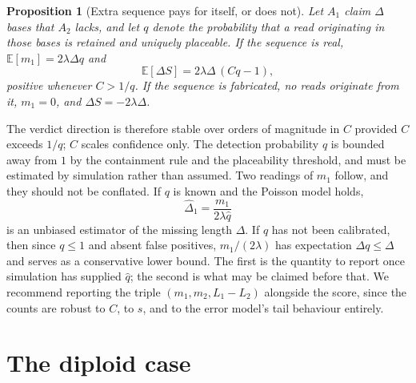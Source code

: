 \documentclass[11pt]{article}
\newtheorem{proposition}{Proposition}
\begin{document}
\begin{proposition}[Extra sequence pays for itself, or does not]
\label{prop:count}
Let $A_1$ claim $\Delta$ bases that $A_2$ lacks, and let $q$ denote the
probability that a read originating in those bases is retained and uniquely
placeable.  If the sequence is real, $\mathbb{E}[m_1] = 2\lambda\Delta q$ and
\begin{equation}
    \mathbb{E}[\Delta S] = 2\lambda\Delta\,(Cq-1),
\end{equation}
positive whenever $C > 1/q$.  If the sequence is fabricated, no reads originate
from it, $m_1 = 0$, and $\Delta S = -2\lambda\Delta$.
\end{proposition}

The verdict direction is therefore stable over orders of magnitude in $C$
provided $C$ exceeds $1/q$; $C$ scales confidence only.  The detection
probability $q$ is bounded away from $1$ by the containment rule and the
placeability threshold, and must be estimated by simulation rather than
assumed.  Two readings of $m_1$ follow, and they should not be conflated.  If $q$ is
known and the Poisson model holds,
\begin{equation}
    \hat\Delta_1 = \frac{m_1}{2\lambda \hat q}
\end{equation}
is an unbiased estimator of the missing length $\Delta$.  If $q$ has not been
calibrated, then since $q \le 1$ and absent false positives,
$m_1/(2\lambda)$ has expectation $\Delta q \le \Delta$ and serves as a
conservative lower bound.  The first is the quantity to report once simulation
has supplied $\hat q$; the second is what may be claimed before that.  We recommend
reporting the triple $(m_1, m_2, L_1-L_2)$ alongside the score, since the counts
are robust to $C$, to $s$, and to the error model's tail behaviour entirely.

\section{The diploid case}
\label{sec:diploid}
\end{document}
